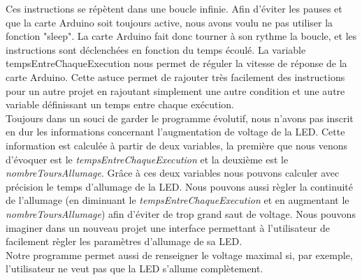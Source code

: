 	Ces instructions se répètent dans une boucle infinie. Afin d'éviter les pauses et que la carte Arduino soit toujours active, nous avons voulu ne pas utiliser la fonction "sleep". La carte Arduino fait donc tourner à son rythme la boucle, et les instructions sont déclenchées en fonction du temps écoulé. La variable tempsEntreChaqueExecution nous permet de réguler la vitesse de réponse de la carte Arduino. Cette astuce permet de rajouter très facilement des instructions pour un autre projet en rajoutant simplement une autre condition et une autre variable définissant un temps entre chaque exécution.\\

	Toujours dans un souci de garder le programme évolutif, nous n'avons pas inscrit en dur les informations concernant l'augmentation de voltage de la LED. Cette information est calculée à partir de deux variables, la première que nous venons d'évoquer est le \textit{tempsEntreChaqueExecution} et la deuxième est le \textit{nombreToursAllumage}. Grâce à ces deux variables nous pouvons calculer avec précision le temps d'allumage de la LED. Nous pouvons aussi règler la continuité de l'allumage (en diminuant le \textit{tempsEntreChaqueExecution} et en augmentant le \textit{nombreToursAllumage}) afin d'éviter de trop grand saut de voltage. Nous pouvons imaginer dans un nouveau projet une interface permettant à l'utilisateur de facilement règler les paramètres d'allumage de sa LED.\\

	Notre programme permet aussi de renseigner le voltage maximal si, par exemple, l'utilisateur ne veut pas que la LED s'allume complètement.
